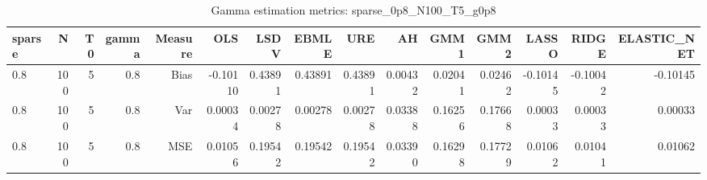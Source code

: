 \begin{table}[!htbp]\centering
\caption{Gamma estimation metrics: sparse_0p8_N100_T5_g0p8}
\label{tab:table1_sparse_0p8_N100_T5_g0p8}
\begin{tabular}{lrrrrrrrrrrrrrr}
\hline
sparse & N & T0 & gamma & Measure & OLS & LSDV & EBMLE & URE & AH & GMM1 & GMM2 & LASSO & RIDGE & ELASTIC_NET \\
\hline
0.8 & 100 & 5 & 0.8 & Bias & -0.10110 & 0.43891 & 0.43891 & 0.43891 & 0.00432 & 0.02041 & 0.02462 & -0.10145 & -0.10042 & -0.10145 \\
0.8 & 100 & 5 & 0.8 & Var & 0.00034 & 0.00278 & 0.00278 & 0.00278 & 0.03388 & 0.16256 & 0.17668 & 0.00033 & 0.00033 & 0.00033 \\
0.8 & 100 & 5 & 0.8 & MSE & 0.01056 & 0.19542 & 0.19542 & 0.19542 & 0.03390 & 0.16298 & 0.17729 & 0.01062 & 0.01041 & 0.01062 \\
\hline
\end{tabular}
\end{table}

